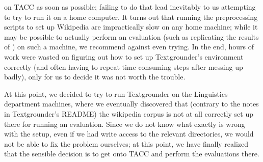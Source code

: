 on TACC as soon as possible; failing to do that lead inevitably to us
attempting to try to run it on a home computer.
It turns out that running the preprocessing scripts to set up Wikipedia are
impractically slow on any home machine; while it may be possible to actually
perform an evaluation (such as replicating the results of \cite{rolleretal:12})
on such a machine, we recommend against even trying.
In the end, hours of work were wasted on figuring out how to set up
Textgrounder's environment correctly (and often having to repeat time consuming
steps after messing up badly), only for us to decide it was not worth the trouble.
\par
At this point, we decided to try to run Textgrounder on the Linguistics
department machines, where we eventually discovered that (contrary to the notes
in Textgrounder's README) the wikipedia corpus is not at all correctly set up
there for running an evaluation.
Since we do not know what exactly is wrong with the setup, even if we had write
access to the relevant directories, we would not be able to fix the problem
ourselves; at this point, we have finally realized that the sensible decision
is to get onto TACC and perform the evaluations there.

